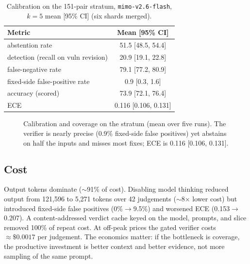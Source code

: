 \documentclass[conference]{IEEEtran}
\newcommand{\code}[1]{\texttt{#1}}
\begin{document}
\begin{table}[t]
\centering
\caption{Calibration on the 151-pair stratum, \code{mimo-v2.6-flash},
$k{=}5$ mean [95\% CI] (six shards merged).}
\label{tab:calib}
\small
\begin{tabular}{@{}lc@{}}
\toprule
Metric & Mean [95\% CI] \\
\midrule
abstention rate & 51.5 [48.5, 54.4] \\
detection (recall on vuln revision) & 20.9 [19.1, 22.8] \\
false-negative rate & 79.1 [77.2, 80.9] \\
fixed-side false-positive rate & 0.9 [0.3, 1.6] \\
accuracy (scored) & 73.9 [72.1, 76.4] \\
ECE & 0.116 [0.106, 0.131] \\
\bottomrule
\end{tabular}
\end{table}

\begin{figure}[t]
\centering
{}
\caption{Calibration and coverage on the stratum (mean over five runs). The
verifier is nearly precise (0.9\% fixed-side false positives) yet abstains on
half the inputs and misses most fixes; ECE is 0.116 [0.106, 0.131].}
\label{fig:calib}
\end{figure}

\subsection{Cost}
Output tokens dominate ($\sim$91\% of cost). Disabling model thinking reduced output
from 121{,}596 to 5{,}271 tokens over 42 judgements ($\sim$8$\times$ lower cost) but
introduced fixed-side false positives (0\%$\to$9.5\%) and worsened ECE
(0.153$\to$0.207). A content-addressed verdict cache keyed on the model, prompts, and
slice removed 100\% of repeat cost. At off-peak prices the gated verifier costs
${\approx}\$0.0017$ per judgement. The economics matter: if the bottleneck is
coverage, the productive investment is better context and better evidence, not more
sampling of the same prompt.
\end{document}
